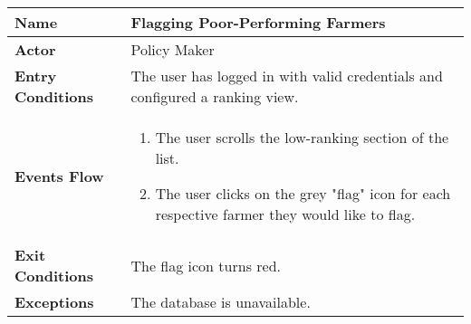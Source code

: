
\begin{center}
\renewcommand{\arraystretch}{1.25}
\begin{tabular}{|l|>{\raggedright\arraybackslash}m{12cm}|}
    \hline
    \textbf{Name} & Flagging Poor-Performing Farmers\\
    \hline
   	\textbf{Actor} & Policy Maker\\
    \hline
    \textbf{Entry Conditions} & The user has logged in with valid credentials and configured a ranking view.\\
    \hline
    \textbf{Events Flow} & 
    \begin{enumerate}
    	\item The user scrolls the low-ranking section of the list.
    	\item The user clicks on the grey "flag" icon for each respective farmer they would like to flag. 
    \end{enumerate}\\
    \hline
    \textbf{Exit Conditions} & The flag icon turns red.\\
    \hline
    \textbf{Exceptions} & The database is unavailable.\\
    \hline
\end{tabular}
\end{center}